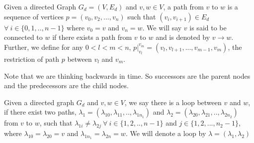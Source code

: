 \begin{definition}[Paths] Given a directed Graph $G_d = (V,E_d)$ and $v,w \in V$, a path from $v$ to $w$ is a sequence of vertices $p = (v_0,v_2,...,v_n)$ such that $(v_i,v_{i+1}) \in E_d$ $\forall \ i \in \{ 0,1,..,n-1 \} $ where $v_0= v $ and $v_n = w$. We will say $v$ is said to be connected to $w$ if there exists a path from $v$ to $w$ and is denoted by $v \rightarrow w$. Further, we define for any $0 < l < m <n$, $p |_{v_l}^{v_m} = (v_l,v_{l+1},...,v_{m-1},v_m)$, the restriction of path $p$ between $v_l$ and $v_m$.

\begin{note}
    Note that we are thinking backwards in time. So successors are the parent nodes and the predecessors are the child nodes.
\end{note}
    
\end{definition}

\begin{definition}[Loops] Given a directed graph $G_d$ and $v,w \in V$, we say there is a loop between $v$ and $w$, if there exist two paths, $\lambda_1 = (\lambda_{10},\lambda_{11},..,\lambda_{1n_1})$ and $\lambda_2 = (\lambda_{20},\lambda_{21},..,\lambda_{2n_2})$ from $v$ to $w$, such that $\lambda_{1i} \neq \lambda_{2j} \ \forall \ i \in \{1,2,..,n-1\}$ and $j \in \{ 1,2,...,n_2-1\}$, where $\lambda_{10}=\lambda_{20}=v$ and $\lambda_{1n_1}=\lambda_{2n}=w$. We will denote a loop by $\lambda = (\lambda_1,\lambda_2)$
\end{definition}


